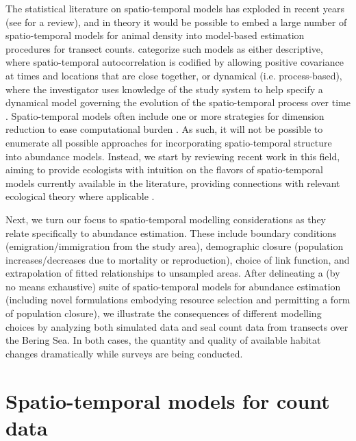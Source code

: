 \documentclass[times,mee,doublespace,]{besauth2}
\begin{document}
The statistical literature on spatio-temporal models has exploded in recent years (see \citeauthor{CressieWikle2011} \citeyear{CressieWikle2011} for a review), and in theory it would be possible to embed a large number of spatio-temporal models for animal density into model-based estimation procedures for transect counts.  \citet{CressieWikle2011} categorize such models as either descriptive, where spatio-temporal autocorrelation is codified by allowing positive covariance at times and locations that are close together, or dynamical (i.e. process-based), where the investigator uses knowledge of the study system to help specify a dynamical model governing the evolution of the spatio-temporal process over time \citep[e.g. via difference equations;][]{WikleHooten2010}.  Spatio-temporal models often include one or more strategies for dimension reduction to ease computational burden \citep[of which there are many; for a review see][]{Wikle2010}.  As such, it will not be possible to enumerate all possible approaches for incorporating spatio-temporal structure into abundance models.
Instead, we start by reviewing recent work in this field, aiming to provide ecologists with intuition on the flavors of spatio-temporal models currently available in the literature, providing connections with relevant ecological theory where applicable \citep[e.g. with ideal free distributions;][]{FretwellLucas1970}.

Next, we turn our focus to spatio-temporal modelling considerations as they relate specifically to abundance estimation.  These include boundary conditions (emigration/immigration from the study area), demographic closure (population increases/decreases due to mortality or reproduction), choice of link function, and extrapolation of fitted relationships to unsampled areas. After delineating a (by no means exhaustive) suite of spatio-temporal models for abundance estimation (including novel formulations embodying resource selection and permitting a form of population closure), we illustrate the consequences of different modelling choices by analyzing both simulated data and seal count data from transects over the Bering Sea. In both cases, the quantity and quality of available habitat changes dramatically while surveys are being conducted.

\section{Spatio-temporal models for count data}
\end{document}
